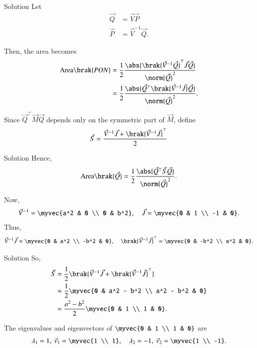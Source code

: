 \documentclass{beamer}
\begin{document}
\begin{frame}{Solution}
Let
\begin{align}
    \vec{Q} &= \vec{V}\vec{P} \\
    \vec{P} &= \vec{V}^{-1}\vec{Q}.
\end{align}

Then, the area becomes
\begin{align}
    \text{Area}\brak{PON}
    &= \frac{1}{2} \frac{\abs{\brak{\vec{V}^{-1}\vec{Q}}^\top \vec{J} \vec{Q}}}{\norm{\vec{Q}}^2} \\
    &= \frac{1}{2} \frac{\abs{\vec{Q}^\top \brak{\vec{V}^{-1}\vec{J}} \vec{Q}}}{\norm{\vec{Q}}^2}.
\end{align}

Since $\vec{Q}^\top \vec{M} \vec{Q}$ depends only on the symmetric part of $\vec{M}$, define
\begin{align}
    \vec{S} = \frac{\vec{V}^{-1}\vec{J} + \brak{\vec{V}^{-1}\vec{J}}^\top}{2}
\end{align}
\end{frame}


\begin{frame}{Solution}
Hence,
\begin{align}
    \text{Area}\brak{\vec{Q}} = \frac{1}{2}\frac{\abs{\vec{Q}^\top \vec{S} \vec{Q}}}{\norm{\vec{Q}}^2}.
\end{align}

Now,
\begin{align}
    \vec{V}^{-1} = \myvec{a^2 & 0 \\ 0 & b^2}, \quad 
    \vec{J} = \myvec{0 & 1 \\ -1 & 0}.
\end{align}
Thus,
\begin{align}
    \vec{V}^{-1}\vec{J} = \myvec{0 & a^2 \\ -b^2 & 0}, \quad
    \brak{\vec{V}^{-1}\vec{J}}^\top = \myvec{0 & -b^2 \\ a^2 & 0}.
\end{align}
\end{frame}


\begin{frame}{Solution}
So,
\begin{align}
    \vec{S} 
    &= \frac{1}{2}\brak{\vec{V}^{-1}\vec{J} + \brak{\vec{V}^{-1}\vec{J}}^\top} \\
    &= \frac{1}{2}\myvec{0 & a^2 - b^2 \\ a^2 - b^2 & 0} \\
    &= \frac{a^2 - b^2}{2}\myvec{0 & 1 \\ 1 & 0}.
\end{align}

The eigenvalues and eigenvectors of 
$\myvec{0 & 1 \\ 1 & 0}$ are
\begin{align}
    \lambda_1 = 1, \ \vec{v}_1 = \myvec{1 \\ 1}, \quad
    \lambda_2 = -1, \ \vec{v}_2 = \myvec{1 \\ -1}.
\end{align}
\end{frame}
\end{document}
